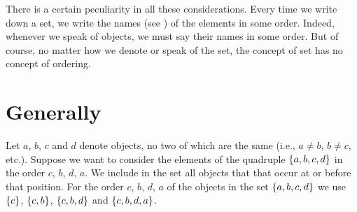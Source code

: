 There is a certain peculiarity in all these considerations.
Every time we write down a set, we write the names (see ) of the elements in some order.
Indeed, whenever we speak of objects, we must say their names in some order.
But of course, no matter how we denote or speak of the set, the concept of set has no concept of ordering.

\section*{Generally}

Let $a$, $b$, $c$ and $d$ denote objects, no two of which are the same (i.e., $a \neq b$, $b \neq c$, etc.).
Suppose we want to consider the elements of the quadruple $\{a, b, c, d\}$ in the order $c$, $b$, $d$, $a$.
We include in the set all objects that that occur at or before that position.
For the order $c$, $b$, $d$, $a$ of the objects in the set $\{a, b, c, d\}$ we use $\{c\}$, $\{c, b\}$, $\{c, b, d\}$ and $\{c, b, d, a\}$.

